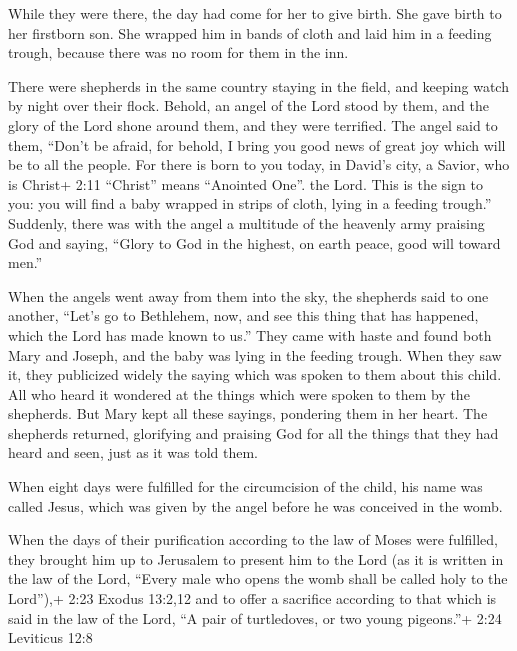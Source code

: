  While they were there, the day had come for her to give
birth.  She gave birth to her firstborn son. She wrapped him
in bands of cloth and laid him in a feeding trough, because there was no
room for them in the inn.

 There were shepherds in the same country staying in the
field, and keeping watch by night over their flock.  Behold,
an angel of the Lord stood by them, and the glory of the Lord shone
around them, and they were terrified.  The angel said to
them, ``Don't be afraid, for behold, I bring you good news of great joy
which will be to all the people.  For there is born to you
today, in David's city, a Savior, who is Christ+ 2:11 ``Christ'' means
``Anointed One''. the Lord.  This is the sign to you: you
will find a baby wrapped in strips of cloth, lying in a feeding
trough.''  Suddenly, there was with the angel a multitude
of the heavenly army praising God and saying,  ``Glory to
God in the highest, on earth peace, good will toward men.''

 When the angels went away from them into the sky, the
shepherds said to one another, ``Let's go to Bethlehem, now, and see
this thing that has happened, which the Lord has made known to us.''
 They came with haste and found both Mary and Joseph, and
the baby was lying in the feeding trough.  When they saw
it, they publicized widely the saying which was spoken to them about
this child.  All who heard it wondered at the things which
were spoken to them by the shepherds.  But Mary kept all
these sayings, pondering them in her heart.  The shepherds
returned, glorifying and praising God for all the things that they had
heard and seen, just as it was told them.

 When eight days were fulfilled for the circumcision of the
child, his name was called Jesus, which was given by the angel before he
was conceived in the womb.

 When the days of their purification according to the law
of Moses were fulfilled, they brought him up to Jerusalem to present him
to the Lord  (as it is written in the law of the Lord,
``Every male who opens the womb shall be called holy to the Lord''),+
2:23 Exodus 13:2,12  and to offer a sacrifice according to
that which is said in the law of the Lord, ``A pair of turtledoves, or
two young pigeons.''+ 2:24 Leviticus 12:8

